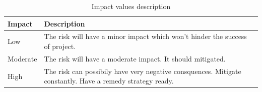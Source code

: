 \begin{table}[h]
\begin{tabular}{ | l | p{11.5cm} | }
  \hline
  \textbf{Impact} & \textbf{Description} \\
  \hline\noalign{\smallskip}\noalign{\smallskip}\hline
  Low       & The risk will have a minor impact which won't hinder the success of project. \\
  Moderate  & The risk will have a moderate impact. It should mitigated. \\
  High      & The risk can possibily have very negative consquences. Mitigate constantly. Have a remedy strategy ready. \\
  \hline
\end{tabular}
\caption{Impact values description}
\label{table:impact}
\end{table}

